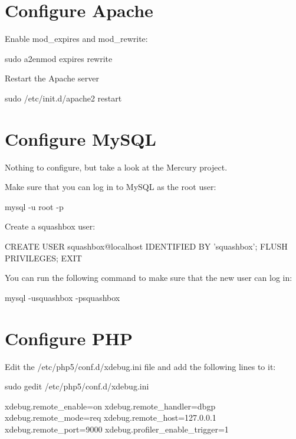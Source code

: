 \documentclass[ebook,10pt,twoside,openright]{memoir}
\begin{document}
\section{Configure Apache}

Enable mod\_expires and mod\_rewrite:

\begin{squashboxcommand}
sudo a2enmod expires rewrite
\end{squashboxcommand}

Restart the Apache server

\begin{squashboxcommand}
sudo /etc/init.d/apache2 restart
\end{squashboxcommand}

\section{Configure MySQL}

Nothing to configure, but take a look at the Mercury project.

Make sure that you can log in to MySQL as the root user:

\begin{squashboxcommand}
mysql -u root -p
\end{squashboxcommand}

Create a squashbox user:

\begin{squashboxcommand}
CREATE USER squashbox@localhost IDENTIFIED BY 'squashbox';
FLUSH PRIVILEGES;
EXIT
\end{squashboxcommand}

You can run the following command to make sure that the new user can log in:

\begin{squashboxcommand}
mysql -usquashbox -psquashbox
\end{squashboxcommand}

\section{Configure PHP}

Edit the /etc/php5/conf.d/xdebug.ini file and add the following lines to it:

\begin{squashboxcommand}
sudo gedit /etc/php5/conf.d/xdebug.ini
\end{squashboxcommand}

\begin{squashboxoutput}
xdebug.remote_enable=on
xdebug.remote_handler=dbgp
xdebug.remote_mode=req
xdebug.remote_host=127.0.0.1
xdebug.remote_port=9000
xdebug.profiler_enable_trigger=1
\end{squashboxoutput}
\end{document}
